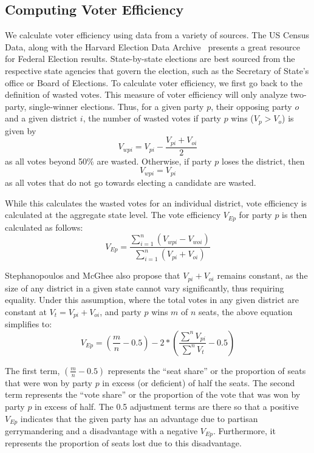 \documentclass[12pt]{article}
\begin{document}
  \subsection{Computing Voter Efficiency}
  We calculate voter efficiency using data from a variety of sources.  The US Census Data, along with the Harvard Election Data Archive~\cite{heda} presents a great resource for Federal Election results.  State-by-state elections are best sourced from the respective state agencies that govern the election, such as the Secretary of State's office or Board of Elections.  To calculate voter efficiency, we first go back to the definition of wasted votes.  This measure of voter efficiency will only analyze two-party, single-winner elections.  Thus, for a given party $p$, their opposing party $o$ and a given district $i$, the number of wasted votes  if party $p$ wins ($V_{p} > V_{o}$)  is given by
    \[ V_{wpi} = V_{pi} - \frac{V_{pi}+V_{oi}}{2}\]
  as all votes beyond 50\% are wasted. Otherwise, if party $p$ loses the district, then
    \[V_{wpi} = V_{pi}\]
  as all votes that do not go towards electing a candidate are wasted.

    While this calculates the wasted votes for an individual district, vote efficiency is calculated at the aggregate state level.  The vote efficiency $V_{Ep}$ for party $p$ is then calculated as follows:
     \[V_{Ep} = \frac{\sum_{i=1}^{n}\left(V_{wpi}-V_{woi}\right)}{\sum_{i=1}^{n}\left(V_{pi}+V_{oi}\right)}\]

     Stephanopoulos and McGhee also propose that $V_{pi}+V_{oi}$ remains constant, as the size of any district in a given state cannot vary significantly, thus requiring equality.  Under this assumption, where the total votes in any given district are constant at $V_{t} = V_{pi}+V_{oi}$, and party $p$ wins $m$ of $n$ seats, the above equation simplifies to:
     \[V_{Ep} = \left(\frac{m}{n}-0.5\right) - 2*\left(\frac{\sum^{n}V_{pi}}{\sum^n{V_t}}-0.5\right)\]

  The first term, $\left(\frac{m}{n}-0.5\right)$ represents the ``seat share'' or the proportion of seats that were won by party $p$ in excess (or deficient) of half the seats.  The second term represents the ``vote share'' or the proportion of the vote that was won by party $p$ in excess of half. The 0.5 adjustment terms are there so that a positive $V_{Ep}$ indicates that the given party has an advantage due to partisan gerrymandering and a disadvantage with a negative $V_{Ep}$.  Furthermore, it represents the proportion of seats lost due to this disadvantage.
\end{document}
